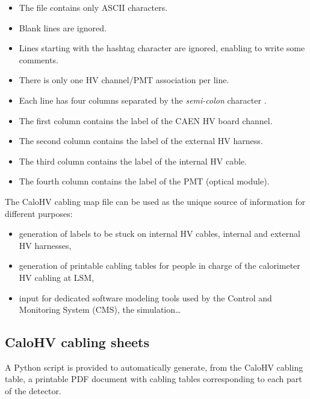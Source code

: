 \begin{itemize}
\item The file contains only ASCII characters.
\item Blank lines are ignored.
\item Lines starting with the hashtag character \fbox{\texttt{\#}} are
  ignored, enabling to write some comments.
\item There is only one HV channel/PMT association per line.
\item Each  line has  four columns  separated by  the \emph{semi-colon}
  character \fbox{\texttt{;}}.
\item The first column contains the label of the CAEN HV board channel.
\item The second column contains the label of the external HV harness.
\item The third column contains the label of the internal HV cable.
\item The fourth column contains the label of the PMT (optical module).
\end{itemize}

\par\noindent The  CaloHV cabling map file  can be used as  the unique
source of information for different purposes:
\begin{itemize}
\item generation of labels to be stuck on internal HV cables, internal and external HV harnesses,
\item generation of  printable cabling tables for people in charge  of the calorimeter HV
  cabling at LSM,
\item input for dedicated software  modeling tools used by the
  Control and Monitoring System (CMS), the simulation\dots 
\end{itemize}


\subsection{CaloHV cabling sheets}


A  Python  script is  provided  to  automatically generate,  from  the
CaloHV cabling table, a printable PDF document with cabling tables
corresponding to each part of the detector.





